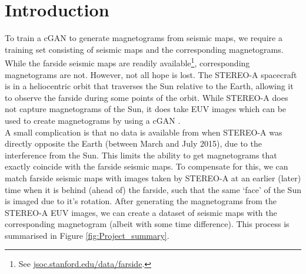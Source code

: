 \documentclass[11pt,a4paper,onecolumn]{report}
\begin{document}
%
%
%
%
\chapter{Introduction}
%
%
%
%





%
%

To train a cGAN to generate magnetograms from seismic maps, we require a
training set consisting of seismic maps and the corresponding magnetograms.
While the farside seismic maps are readily available\footnote{See
  \url{jsoc.stanford.edu/data/farside}.}, corresponding magnetograms are
not. However, not all hope is lost. The STEREO-A spacecraft is in a heliocentric
orbit that traverses the Sun relative to the Earth, allowing it to observe the
farside during some points of the orbit. While STEREO-A does not capture
magnetograms of the Sun, it does take EUV images which can be used to create
magnetograms by using a cGAN \citep{Kim2019}.\\

A small complication is that no data is available from when STEREO-A was
directly opposite the Earth (between March and July 2015), due to the
interference from the Sun. This limits the ability to get magnetograms that
exactly coincide with the farside seismic maps. To compensate for this, we can
match farside seismic maps with images taken by STEREO-A at an earlier (later)
time when it is behind (ahead of) the farside, such that the same `face' of the
Sun is imaged due to it's rotation. After generating the magnetograms from the
STEREO-A EUV images, we can create a dataset of seismic maps with the
corresponding magnetogram (albeit with some time difference). This process is
summarised in Figure \ref{fig:Project_summary}.\\
\end{document}
